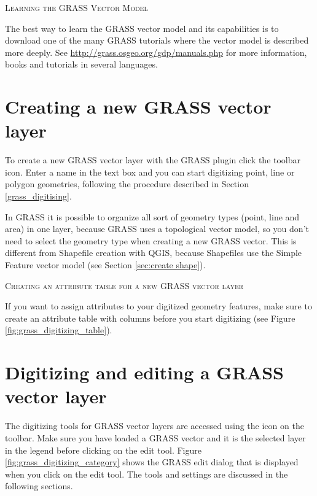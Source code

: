 \begin{Tip}\caption{\textsc{Learning the GRASS Vector Model}}
The best way to learn the GRASS vector model and its capabilities is to
download one of the many GRASS tutorials where the vector model is described
more deeply. See \url{http://grass.osgeo.org/gdp/manuals.php} for more
information, books and tutorials in several languages.
\end{Tip}

\section{Creating a new GRASS vector layer}\label{sec:creating_new_grass_vectors}

To create a new GRASS vector layer with the GRASS plugin click the
 toolbar icon.
Enter a name in the text box and you can start digitizing point, line or
polygon geometries, following the procedure described in Section
\ref{grass_digitising}.

In GRASS it is possible to organize all sort of geometry types (point, line
and area) in one layer, because GRASS uses a topological vector model, so you
don't need to select the geometry type when creating a new GRASS vector. This
is different from Shapefile creation with QGIS, because Shapefiles use the
Simple Feature vector model (see Section \ref{sec:create shape}).

\begin{Tip}\caption{\textsc{Creating an attribute table for a new GRASS vector layer}}
If you want to assign attributes to your digitized geometry features, make sure to create an attribute table with columns before you start digitizing (see Figure \ref{fig:grass_digitizing_table}).
\end{Tip}

\section{Digitizing and editing a GRASS vector layer}\label{grass_digitising}

The digitizing tools for GRASS vector layers are accessed using the
 icon on the toolbar. Make
sure you have loaded a GRASS vector and it is the selected layer in the legend
before clicking on the edit tool. Figure \ref{fig:grass_digitizing_category}
shows the GRASS edit dialog that is displayed when you click on the edit tool.
The tools and settings are discussed in the following sections.

